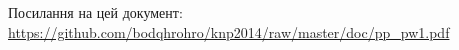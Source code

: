 \documentclass[a4paper,14pt]{article}
\begin{document}
\pagestyle{empty}
\makeatletter
\renewcommand{\@oddhead}{\hfil\thepage}
\makeatother


Посилання на цей документ: \url{https://github.com/bodqhrohro/knp2014/raw/master/doc/pp_pw1.pdf}
\end{document}
